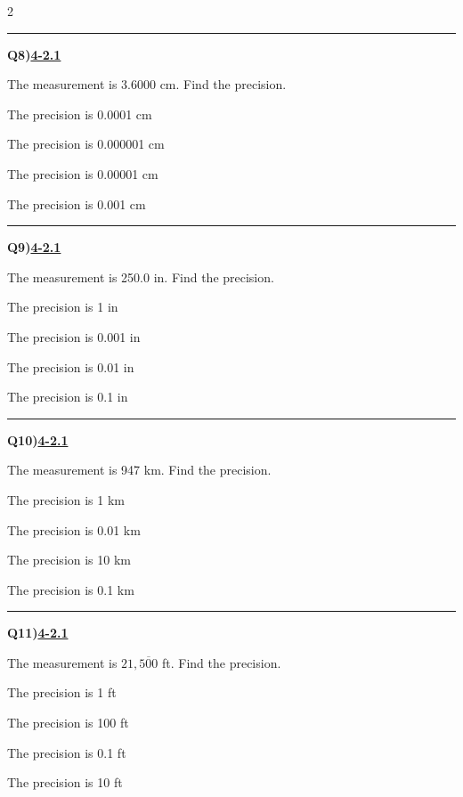 \documentclass[11pt]{article}
\newenvironment{Qbox}[2]{%
  \par\medskip\noindent\begin{minipage}{\linewidth}%
  \hrule\medskip%
  \textbf{Q#1)}\hfill\textbf{\underline{#2}}\par\smallskip%
}{\par\end{minipage}\par\medskip}
\begin{document}
\begin{multicols}{2}
\begin{Qbox}{8}{4-2.1}
The measurement is 3.6000 cm. Find the precision.
\begin{choices}
  \item The precision is 0.0001 cm
  \item The precision is 0.000001 cm
  \item The precision is 0.00001 cm
  \item The precision is 0.001 cm
\end{choices}
\end{Qbox}

\begin{Qbox}{9}{4-2.1}
The measurement is 250.0 in. Find the precision.
\begin{choices}
  \item The precision is 1 in
  \item The precision is 0.001 in
  \item The precision is 0.01 in
  \item The precision is 0.1 in
\end{choices}
\end{Qbox}

\begin{Qbox}{10}{4-2.1}
The measurement is 947 km. Find the precision.
\begin{choices}
  \item The precision is 1 km
  \item The precision is 0.01 km
  \item The precision is 10 km
  \item The precision is 0.1 km
\end{choices}
\end{Qbox}

\begin{Qbox}{11}{4-2.1}
The measurement is $21{,}5\overline{0}0$ ft. Find the precision.
\begin{choices}
  \item The precision is 1 ft
  \item The precision is 100 ft
  \item The precision is 0.1 ft
  \item The precision is 10 ft
\end{choices}
\end{Qbox}


\end{multicols}
\end{document}
